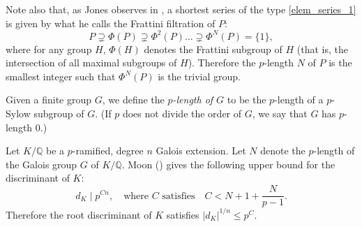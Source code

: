 \documentclass{amsart}
\theoremstyle{definition}
\newcommand{\Q}{\mathbb{Q}}
\renewcommand{\leq}{\leqslant}
\begin{document}
Note also that, as Jones observes in \cite[Section 2.2]{Jo}, a shortest series of the type \eqref{elem_series_1} is given by what he calls the Frattini filtration of $P$:
\begin{equation*}
  P\supsetneq \Phi(P)\supsetneq \Phi^2(P)\dots\supsetneq \Phi^N(P)=\{1\},
\end{equation*}
where for any group $H$, $\Phi(H)$ denotes the Frattini subgroup of $H$ (that is, the intersection of all maximal subgroups of $H$).
Therefore the $p$-length $N$ of $P$ is the smallest integer such that $\Phi^N(P)$ is the trivial group.

Given a finite group $G$, we define the \emph{$p$-length of $G$} to be the $p$-length of a $p$-Sylow subgroup of $G$.
(If $p$ does not divide the order of $G$, we say that $G$ has $p$-length $0$.)

Let $K/\Q$ be a $p$-ramified, degree $n$ Galois extension.
Let $N$ denote the $p$-length of the Galois group $G$ of $K/\Q$.
Moon (\cite[Proposition 2.4]{Mo1}) gives the following upper bound for the discriminant of $K$:
\begin{equation*}
  d_K \mid p^{Cn},\quad\text{where $C$ satisfies}\quad C<N+1+\frac{N}{p-1}.
\end{equation*}
Therefore the root discriminant of $K$ satisfies $|d_K|^{1/n}\leq p^C$.
\end{document}
